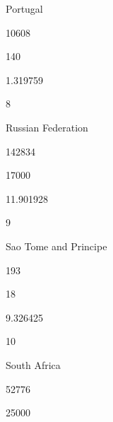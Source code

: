 \documentclass[letterpaper,10pt,english]{sphinxmanual}
\begin{document}
Portugal





10608





140





1.319759









8





Russian Federation





142834





17000





11.901928









9





Sao Tome and Principe





193





18





9.326425









10





South Africa





52776





25000
\end{document}
